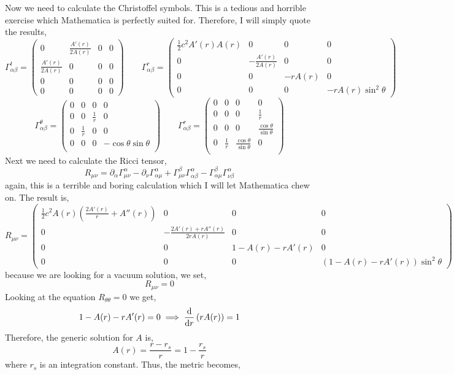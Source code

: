 \documentclass[11pt, a4paper]{article}
\begin{document}
Now we need to calculate the Christoffel symbols. This is a tedious and horrible exercise which Mathematica is perfectly suited for. Therefore, I will simply quote the results,
\[
\Gamma^t_{\alpha \beta} = 
\begin{pmatrix}
0 & \frac{A'(r)}{2 A(r)} & 0 & 0 \\
\frac{A'(r)}{2 A(r)} & 0 & 0 & 0 \\
0 & 0 & 0 & 0 \\
0 & 0 & 0 & 0
\end{pmatrix}
\quad \quad 
\Gamma^r_{\alpha \beta} = 
\begin{pmatrix}
\tfrac{1}{2} c^2 A'(r) A(r) & 0 & 0 & 0 \\
0 & - \frac{A'(r)}{2 A(r)} & 0 & 0 \\
0 & 0 & - r A(r) & 0 \\
0 & 0 & 0 & - r A(r) \sin^2{\theta}
\end{pmatrix}
\]
\[
\Gamma^\theta_{\alpha \beta} = 
\begin{pmatrix}
0 & 0 & 0 & 0 \\
0 & 0 & \frac{1}{r} & 0 \\
0 & \frac{1}{r} & 0 & 0 \\
0 & 0 & 0 & - \cos{\theta} \sin{\theta} \\
\end{pmatrix}
\quad \quad 
\Gamma^r_{\alpha \beta} = 
\begin{pmatrix}
0 & 0 & 0 & 0 \\
0 & 0 & 0 & \frac{1}{r} \\
0 & 0 & 0 & \frac{\cos{\theta}}{\sin{\theta}} \\
0 & \frac{1}{r} & \frac{\cos{\theta}}{\sin{\theta}} & 0 \\
\end{pmatrix}
\]
Next we need to calculate the Ricci tensor,
\[ R_{\mu \nu} = \partial_{\alpha} \Gamma^{\alpha}_{\mu \nu} - \partial_{\nu} \Gamma^{\alpha}_{\alpha \mu} + \Gamma^{\beta}_{\mu \nu} \Gamma^{\alpha}_{\alpha \beta} - \Gamma^{\beta}_{\alpha \mu} \Gamma^{\alpha}_{\nu \beta} \] 
again, this is a terrible and boring calculation which I will let Mathematica chew on. The result is,
\[
R_{\mu \nu} = 
\begin{pmatrix}
\tfrac{1}{2} c^2 A(r) \left( \frac{2 A'(r)}{r} + A''(r) \right) & 0 & 0 & 0 \\ 
0 & - \frac{2 A'(r) + r A''(r)}{2 r A(r)} & 0 & 0 \\
0 & 0 & 1 - A(r) - r A'(r) & 0 \\
0 & 0 & 0 & (1 - A(r) - r A'(r)) \sin^2{\theta} 
\end{pmatrix}
\]
because we are looking for a vacuum solution, we set,
\[ R_{\mu \nu} = 0 \]
Looking at the equation $R_{\theta \theta} = 0$ we get,
\[ 1 - A(r) - r A'(r) = 0 \implies \frac{\mathrm{d}}{\mathrm{d}r} \left( r A(r) \right) = 1 \]
Therefore, the generic solution for $A$ is,
\[ A(r) = \frac{r - r_s}{r} = 1 - \frac{r_s}{r} \]
where $r_s$ is an integration constant. Thus, the metric becomes, 
\newcommand{\sfactor}{\left(1 - \frac{r_s}{r} \right)}
\end{document}

